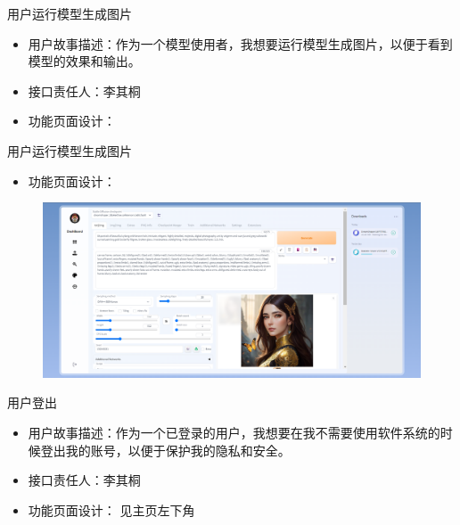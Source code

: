\begin{frame}{用户运行模型生成图片}
    \begin{itemize}
        \item 用户故事描述：作为一个模型使用者，我想要运行模型生成图片，以便于看到模型的效果和输出。
        \item 接口责任人：李其桐
        \item 功能页面设计：
    \end{itemize}
\end{frame}

\begin{frame}{用户运行模型生成图片}
    \begin{itemize}
        \item 功能页面设计：
    \end{itemize}
    \begin{figure}[H]
        \centering
        \includegraphics[width=\textwidth]{contents/figure/txt2img.png}
    \end{figure}
\end{frame}

\begin{frame}{用户登出}
    \begin{itemize}
        \item 用户故事描述：作为一个已登录的用户，我想要在我不需要使用软件系统的时候登出我的账号，以便于保护我的隐私和安全。
        \item 接口责任人：李其桐
        \item 功能页面设计： 见主页左下角
    \end{itemize}
\end{frame}